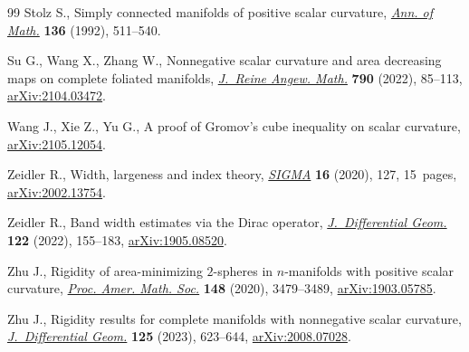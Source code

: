 \begin{thebibliography}{99}
Stolz S., Simply connected manifolds of positive scalar curvature, \href{https://doi.org/10.2307/2946598}{\textit{Ann.
  of Math.}} \textbf{136} (1992), 511--540.

Su G., Wang X., Zhang W., Nonnegative scalar curvature and area decreasing maps
  on complete foliated manifolds, \href{https://doi.org/10.1515/crelle-2022-0038}{\textit{J.~Reine Angew. Math.}} \textbf{790}
  (2022), 85--113, \href{https://arxiv.org/abs/2104.03472}{arXiv:2104.03472}.

Wang J., Xie Z., Yu G., A proof of {G}romov's cube inequality on scalar
  curvature, \href{https://arxiv.org/abs/2105.12054}{arXiv:2105.12054}.

Zeidler R., Width, largeness and index theory, \href{https://doi.org/10.3842/SIGMA.2020.127}{\textit{SIGMA}} \textbf{16}
  (2020), 127, 15~pages, \href{https://arxiv.org/abs/2002.13754}{arXiv:2002.13754}.

Zeidler R., Band width estimates via the {D}irac operator,
  \href{https://doi.org/10.4310/jdg/1668186790}{\textit{J.~Differential Geom.}} \textbf{122} (2022), 155--183,
  \href{https://arxiv.org/abs/1905.08520}{arXiv:1905.08520}.

Zhu J., Rigidity of area-minimizing {$2$}-spheres in {$n$}-manifolds with
  positive scalar curvature, \href{https://doi.org/10.1090/proc/15033}{\textit{Proc. Amer. Math. Soc.}} \textbf{148}
  (2020), 3479--3489, \href{https://arxiv.org/abs/1903.05785}{arXiv:1903.05785}.

Zhu J., Rigidity results for complete manifolds with nonnegative scalar
  curvature, \href{https://doi.org/10.4310/jdg/1701804153}{\textit{J.~Differential Geom.}} \textbf{125} (2023), 623--644,
  \href{https://arxiv.org/abs/2008.07028}{arXiv:2008.07028}.

\end{thebibliography}
